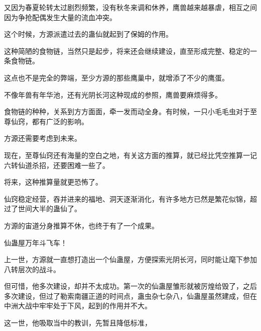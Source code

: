 \begin{this_body}
又因为春夏轮转太过剧烈频繁，没有秋冬来调和休养，鹰兽越来越暴虐，相互之间因为争抢配偶发生大量的流血冲突。

这个时候，方源派遣过去的蛊仙就起到了保姆的作用。

这种简陋的食物链，当然只是起步，将来还会继续建设，直至形成完整、稳定的一条食物链。

这点也不是完全的弊端，至少方源的那些鹰巢中，就增添了不少的鹰蛋。

不像年兽有年华池，还有光阴长河这种现成的参照，鹰兽要麻烦得多。

食物链的种种，关系到方方面面，牵一发而动全身。有时候，一只小毛毛虫对于至尊仙窍，都有广泛的影响。

方源还需要考虑到未来。

现在，至尊仙窍还有海量的空白之地，有关这方面的推算，就已经比凭空推算一记六转仙道杀招，还要困难一些了。

将来，这种推算量就更恐怖了。

仙窍稳定经营，吞并进来的福地、洞天逐渐消化，有许多地方已然是繁花似锦，超过了世间大半的蛊仙了。

方源的宙道分身推算不休，也终于有了一个成果。

仙蛊屋万年斗飞车！

上一世，方源就一直想打造出一个仙蛊屋，方便探索光阴长河，同时能让麾下参加八转层次的战斗。

但可惜，他多次建设，却并不太成功。第一次的仙蛊屋雏形就被厉煌给毁了，之后多次建设，但过了勒索南疆正道的时间点，蛊虫杂七杂八，仙蛊屋虽然建成，但在中洲大战中牢牢处于下风，起到的作用并不大。

这一世，他吸取当中的教训，先暂且降低标准，

\end{this_body}

